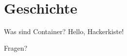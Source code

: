 \documentclass{beamer}
\begin{document}
  \section{Geschichte}
  \begin{frame}{Was sind Container?}
    Hello, Hackerkiste!
  \end{frame}


  \begin{frame}[standout]
    Fragen?
  \end{frame}
\end{document}
